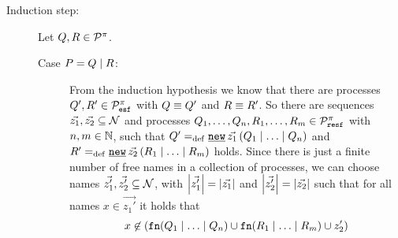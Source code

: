 \begin{prf}
\begin{description}
\item[Induction step:] Let $Q,R\in\mathcal P^{\pi}$.
	\begin{description}		
\item[Case $P=Q \mid R$:] From the induction hypothesis we know that there are processes $Q',R'\in\mathcal P^{\pi}_{\mathtt{esf}}$ with $Q\equiv{}{}Q'$ and $R\equiv{}{}R'$. So there are sequences $\vec{z_1},\vec{z_2}\subseteq\mathcal N$ and processes $Q_1,\ldots,Q_n,R_1,\ldots,R_m\in\mathcal P^{\pi}_{\mathtt{resf}}$ with $n,m\in\mathbb N$, such that $Q'\define\procres[()]{\vec{z_1}}{\procpar{Q_1}{\procpar{\ldots}{Q_n}}}$ and $R'\define\procres[()]{\vec{z_2}}{\procpar{R_1}{\procpar{\ldots}{R_m}}}$ holds. Since there is just a finite number of free names in a collection of processes, we can choose names $\vec{z_1'},\vec{z_2'}\subseteq{}\mathcal N$, with $\left|\vec{z_1'}\right|=\left|\vec{z_1}\right|$ and $\left|\vec{z_2'}\right|=\left|\vec{z_2}\right|$ such that for all names $x\in\vec{z_1'}$ it holds that
\[x\not\in\left(\mathtt{fn}(Q_1 \mid \ldots \mid Q_n)\cup\mathtt{fn}(R_1 \mid \ldots \mid R_m)\cup{}z_2'\right)\]

\end{description}
\end{description}
\end{prf}
